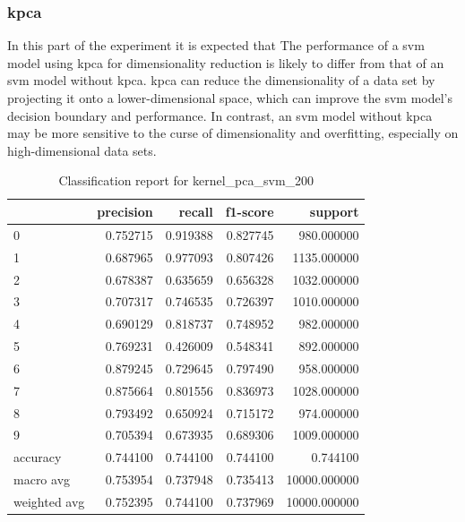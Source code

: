 \subsubsection{\gls{kpca}}\label{subsubsec:experiment_4_kernel_pca}
In this part of the experiment it is expected that The performance of a \gls{svm} model using  \gls{kpca} for dimensionality reduction is likely to differ from that of an \gls{svm} model without \gls{kpca}. \gls{kpca} can reduce the dimensionality of a data set by projecting it onto a lower-dimensional space, which can improve the \gls{svm} model's decision boundary and performance. In contrast, an \gls{svm} model without \gls{kpca} may be more sensitive to the curse of dimensionality and overfitting, especially on high-dimensional data sets. 

\begin{table}[htb!]
    \centering
    \begin{tabular}{lrrrr}
        \toprule
        & precision & recall & f1-score & support \\
        \midrule
        0 & 0.752715 & 0.919388 & 0.827745 & 980.000000 \\
        1 & 0.687965 & 0.977093 & 0.807426 & 1135.000000 \\
        2 & 0.678387 & 0.635659 & 0.656328 & 1032.000000 \\
    3 & 0.707317 & 0.746535 & 0.726397 & 1010.000000 \\
    4 & 0.690129 & 0.818737 & 0.748952 & 982.000000 \\
    5 & 0.769231 & 0.426009 & 0.548341 & 892.000000 \\
    6 & 0.879245 & 0.729645 & 0.797490 & 958.000000 \\
    7 & 0.875664 & 0.801556 & 0.836973 & 1028.000000 \\
    8 & 0.793492 & 0.650924 & 0.715172 & 974.000000 \\
    9 & 0.705394 & 0.673935 & 0.689306 & 1009.000000 \\
    accuracy & 0.744100 & 0.744100 & 0.744100 & 0.744100 \\
    macro avg & 0.753954 & 0.737948 & 0.735413 & 10000.000000 \\
    weighted avg & 0.752395 & 0.744100 & 0.737969 & 10000.000000 \\
    \bottomrule
\end{tabular}
\caption{Classification report for kernel\_pca\_svm\_200}
\label{tab:classification-report-kernel_pca_svm_200}
\end{table}


